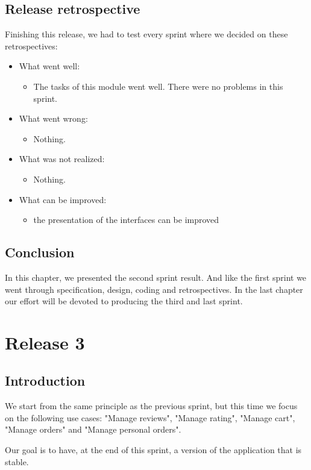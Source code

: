 \documentclass[12pt,a4paper]{report}
\begin{document}
	\section{Release retrospective}
		Finishing this release, we had to test every sprint where we decided on these retrospectives:\\
	\begin{itemize}
		\item	What went well:
		\begin{itemize}
			\item The tasks of this module went well. There were no problems
			in this sprint.
		\end{itemize}
	\end{itemize}
	\begin{itemize}
		\item	What went wrong:
		\begin{itemize}
			\item Nothing.
		\end{itemize}
	\end{itemize}
	\begin{itemize}
		\item	What was not realized:
		\begin{itemize}
			\item Nothing.
		\end{itemize}
	\end{itemize}
	\begin{itemize}
		\item	What can be improved:
		\begin{itemize}
			\item the presentation of the interfaces can be improved
		\end{itemize}
	\end{itemize}
	\section*{Conclusion}
	In this chapter, we presented the second sprint result. And like the first sprint we went through specification, design, coding and retrospectives. In the last chapter our effort will be devoted to producing the third and last sprint.
	
	\chapter{Release 3}
	\section*{Introduction}
	We start from the same principle as the previous sprint, but this time we focus on the following use cases: "Manage reviews", "Manage rating", "Manage cart", "Manage orders" and "Manage personal orders".\par 
	Our goal is to have, at the end of this sprint, a version of the application that is stable.
\end{document}
